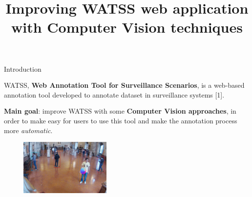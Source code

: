 \documentclass{beamer}
\author{}
\title{\huge Improving WATSS web application with Computer Vision techniques}
\date{}
\begin{document}
\titlepageframe

\begin{tframe}{Introduction}

WATSS, \textbf{Web Annotation Tool for Surveillance Scenarios}, is a web-based annotation tool developed to annotate dataset in surveillance systems [1].

\vspace{0.3cm}

\textbf{Main goal}: improve WATSS with some \textbf{Computer Vision approaches}, in order to make easy for users to use this tool and make the annotation process more \emph{automatic}.

\begin{figure}[h]
\begin{center}
\includegraphics[width=0.4\textwidth]{images/frame.jpg}
\end{center}
\label{fig:mainframe}
\end{figure}

\end{tframe}
\end{document}
